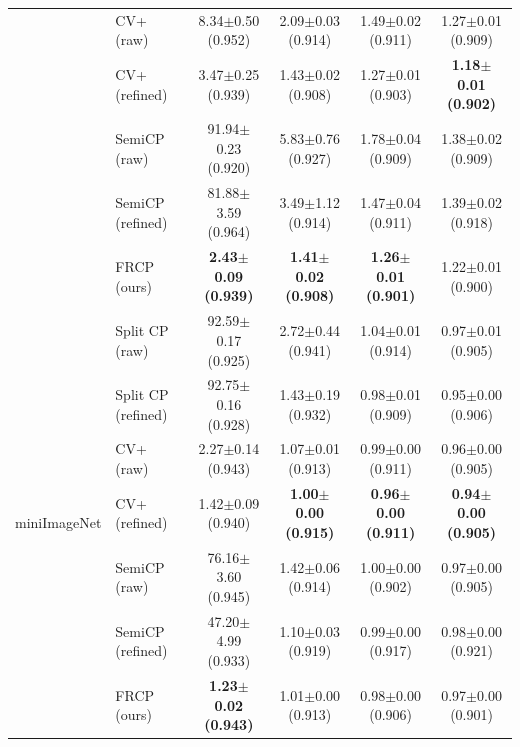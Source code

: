 \begin{table}[t]
\begin{tabular}{llcccc}
 & CV+ (raw) & 8.34$\pm$0.50 {\scriptsize(0.952)} & 2.09$\pm$0.03 {\scriptsize(0.914)} & 1.49$\pm$0.02 {\scriptsize(0.911)} & 1.27$\pm$0.01 {\scriptsize(0.909)}\\
 & CV+ (refined) & 3.47$\pm$0.25 {\scriptsize(0.939)} & 1.43$\pm$0.02 {\scriptsize(0.908)} & 1.27$\pm$0.01 {\scriptsize(0.903)} & \textbf{1.18$\pm$0.01 {\scriptsize(0.902)}}\\
 & SemiCP (raw) & 91.94$\pm$0.23 {\scriptsize(0.920)} & 5.83$\pm$0.76 {\scriptsize(0.927)} & 1.78$\pm$0.04 {\scriptsize(0.909)} & 1.38$\pm$0.02 {\scriptsize(0.909)}\\
 & SemiCP (refined) & 81.88$\pm$3.59 {\scriptsize(0.964)} & 3.49$\pm$1.12 {\scriptsize(0.914)} & 1.47$\pm$0.04 {\scriptsize(0.911)} & 1.39$\pm$0.02 {\scriptsize(0.918)}\\
 & FRCP (ours) & \textbf{2.43$\pm$0.09 {\scriptsize(0.939)}} & \textbf{1.41$\pm$0.02 {\scriptsize(0.908)}} & \textbf{1.26$\pm$0.01 {\scriptsize(0.901)}} & 1.22$\pm$0.01 {\scriptsize(0.900)}\\
\midrule
\multirow{7}{*}{miniImageNet} & Split CP (raw) & 92.59$\pm$0.17 {\scriptsize(0.925)} & 2.72$\pm$0.44 {\scriptsize(0.941)} & 1.04$\pm$0.01 {\scriptsize(0.914)} & 0.97$\pm$0.01 {\scriptsize(0.905)}\\
 & Split CP (refined) & 92.75$\pm$0.16 {\scriptsize(0.928)} & 1.43$\pm$0.19 {\scriptsize(0.932)} & 0.98$\pm$0.01 {\scriptsize(0.909)} & 0.95$\pm$0.00 {\scriptsize(0.906)}\\
 & CV+ (raw) & 2.27$\pm$0.14 {\scriptsize(0.943)} & 1.07$\pm$0.01 {\scriptsize(0.913)} & 0.99$\pm$0.00 {\scriptsize(0.911)} & 0.96$\pm$0.00 {\scriptsize(0.905)}\\
 & CV+ (refined) & 1.42$\pm$0.09 {\scriptsize(0.940)} & \textbf{1.00$\pm$0.00 {\scriptsize(0.915)}} & \textbf{0.96$\pm$0.00 {\scriptsize(0.911)}} & \textbf{0.94$\pm$0.00 {\scriptsize(0.905)}}\\
 & SemiCP (raw) & 76.16$\pm$3.60 {\scriptsize(0.945)} & 1.42$\pm$0.06 {\scriptsize(0.914)} & 1.00$\pm$0.00 {\scriptsize(0.902)} & 0.97$\pm$0.00 {\scriptsize(0.905)}\\
 & SemiCP (refined) & 47.20$\pm$4.99 {\scriptsize(0.933)} & 1.10$\pm$0.03 {\scriptsize(0.919)} & 0.99$\pm$0.00 {\scriptsize(0.917)} & 0.98$\pm$0.00 {\scriptsize(0.921)}\\
 & FRCP (ours) & \textbf{1.23$\pm$0.02 {\scriptsize(0.943)}} & 1.01$\pm$0.00 {\scriptsize(0.913)} & 0.98$\pm$0.00 {\scriptsize(0.906)} & 0.97$\pm$0.00 {\scriptsize(0.901)}\\
\midrule

\end{tabular}
\end{table}
